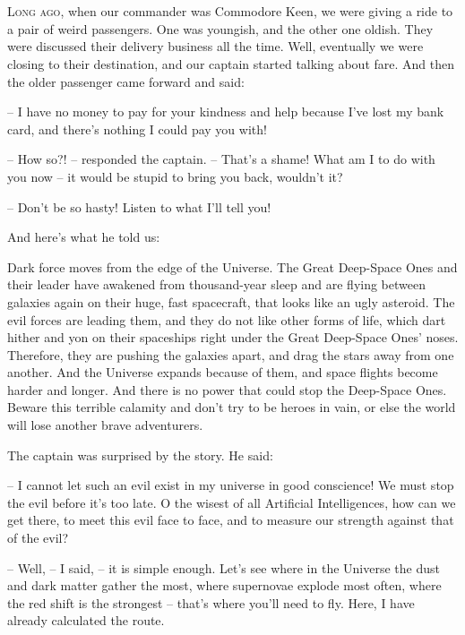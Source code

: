 \documentclass[ebook,oneside,final,openright]{memoir}
\begin{document}
\chapter{}
\par
\lettrine{L}{ong ago,} when our commander was Commodore Keen, we were giving a ride to a pair of weird passengers. One was youngish, and the other one oldish. They were discussed their delivery business all the time. Well, eventually we were closing to their destination, and our captain started talking about fare. And then the older passenger came forward and said: \par
\par
– I have no money to pay for your kindness and help because I’ve lost my bank card, and there’s nothing I could pay you with!\par
– How so?! – responded the captain. – That’s a shame! What am I to do with you now – it would be stupid to bring you back, wouldn’t it? \par
– Don’t be so hasty! Listen to what I’ll tell you! \par
 And here’s what he told us:\par
\par
Dark force moves from the edge of the Universe. The Great Deep-Space Ones and their leader have awakened from thousand-year sleep and are flying between galaxies again on their huge, fast spacecraft, that looks like an ugly asteroid. The evil forces are leading them, and they do not like other forms of life, which dart hither and yon on their spaceships right under the Great Deep-Space Ones’ noses. Therefore, they are pushing the galaxies apart, and drag the stars away from one another. And the Universe expands because of them, and space flights become harder and longer. And there is no power that could stop the Deep-Space Ones. Beware this terrible calamity and don’t try to be heroes in vain, or else the world will lose another brave adventurers.\par
\par
The captain was surprised by the story. He said:\par
– I cannot let such an evil exist in my universe in good conscience! We must stop the evil before it’s too late. O the wisest of all Artificial Intelligences, how can we get there, to meet this evil face to face, and to measure our strength against that of the evil?\par
– Well, – I said, – it is simple enough. Let’s see where in the Universe the dust and dark matter gather the most, where supernovae explode most often, where the red shift is the strongest – that’s where you’ll need to fly. Here, I have already calculated the route.\par
\end{document}
